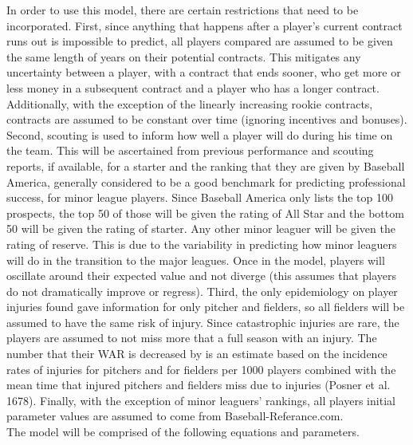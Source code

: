 \documentclass[12pt]{article}
\newcommand\tab[1][1cm]{\hspace*{#1}}
\begin{document}
	\tab In order to use this model, there are certain restrictions that need to be incorporated.  First, since anything that happens after a player's current contract runs out is impossible to predict, all players compared are assumed to be given the same length of years on their potential contracts.  This mitigates any uncertainty between a player, with a contract that ends sooner, who get more or less money in a subsequent contract and a player who has a longer contract.  Additionally, with the exception of the linearly increasing rookie contracts, contracts are assumed to be constant over time (ignoring incentives and bonuses).  Second, scouting is used to inform how well a player will do during his time on the team.  This will be ascertained from previous performance and scouting reports, if available, for a starter and the ranking that they are given by Baseball America, generally considered to be a good benchmark for predicting professional success, for minor league players.  Since Baseball America only lists the top 100 prospects, the top 50 of those will be given the rating of All Star and the bottom 50 will be given the rating of starter.  Any other minor leaguer will be given the rating of reserve.  This is due to the variability in predicting how minor leaguers will do in the transition to the major leagues.  Once in the model, players will oscillate around their expected value and not diverge (this assumes that players do not dramatically improve or regress).  Third, the only epidemiology on player injuries found gave information for only pitcher and fielders, so all fielders will be assumed to have the same risk of injury.  Since catastrophic injuries are rare, the players are assumed to not miss more that a full season with an injury.  The number that their WAR is decreased by is an estimate based on the incidence rates of injuries for pitchers and for fielders per 1000 players combined with the mean time that injured pitchers and fielders miss due to injuries (Posner et al. 1678).  Finally, with the exception of minor leaguers' rankings, all players initial parameter values are assumed to come from Baseball-Referance.com.  \\
	\tab The model will be comprised of the following equations and parameters. \\
	
\end{document}
